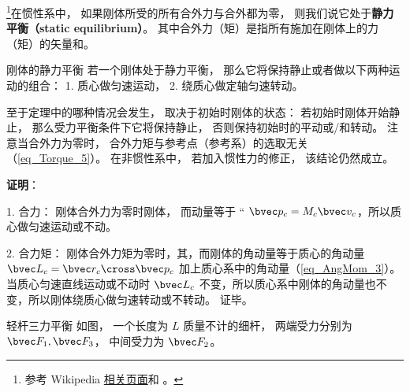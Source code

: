 

\footnote{参考 Wikipedia \href{https://en.wikipedia.org/wiki/Mechanical_equilibrium}{相关页面}和 \cite{新力}。}在惯性系中， 如果刚体所受的所有合外力与合外都为零， 则我们说它处于\textbf{静力平衡（static equilibrium）}。 其中合外力（矩）是指所有施加在刚体上的力（矩）的矢量和。

\begin{theorem}{刚体的静力平衡}
若一个刚体处于静力平衡， 那么它将保持静止或者做以下两种运动的组合： 1. 质心做匀速运动， 2. 绕质心做定轴匀速转动。
\end{theorem}
至于定理中的哪种情况会发生， 取决于初始时刚体的状态： 若初始时刚体开始静止， 那么受力平衡条件下它将保持静止， 否则保持初始时的平动或/和转动。 注意当合外力为零时， 合外力矩与参考点（参考系）的选取无关（\autoref{eq_Torque_5}）。 在非惯性系中， 若加入惯性力的修正， 该结论仍然成立。 

\textbf{证明}：

1. 合力： 刚体合外力为零时刚体， 而动量等于 “
$\bvec p_c = M_c \bvec v_c$，所以质心做匀速运动或不动。

2. 合力矩： 刚体合外力矩为零时，其，而刚体的角动量等于质心的角动量 $\bvec L_c =\bvec r_c\cross \bvec p_c$ 加上质心系中的角动量（\autoref{eq_AngMom_3}）。 当质心匀速直线运动或不动时 $\bvec L_c$ 不变，所以质心系中刚体的角动量也不变，所以刚体绕质心做匀速转动或不转动。 证毕。

\begin{example}{轻杆三力平衡}
如图， 一个长度为 $L$ 质量不计的细杆， 两端受力分别为 $\bvec F_1, \bvec F_3$， 中间受力为 $\bvec F_2$。
\end{example}


